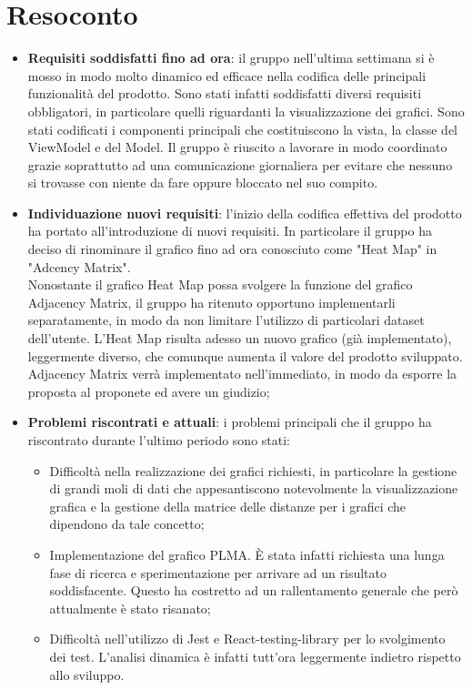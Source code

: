 \section{Resoconto}
\begin{itemize}
	\item \textbf{Requisiti soddisfatti fino ad ora}: il gruppo nell'ultima settimana si è mosso in modo molto dinamico ed efficace nella codifica delle principali funzionalità del prodotto. Sono stati infatti soddisfatti diversi requisiti obbligatori, in particolare quelli riguardanti la visualizzazione dei grafici. Sono stati codificati i componenti principali che costituiscono la vista, la classe del ViewModel e del Model. Il gruppo è riuscito a lavorare in modo coordinato grazie soprattutto ad una comunicazione giornaliera per evitare che nessuno si trovasse con niente da fare oppure bloccato nel suo compito.
	\item \textbf{Individuazione nuovi requisiti}: l'inizio della codifica effettiva del prodotto ha portato all'introduzione di nuovi requisiti. In particolare il gruppo ha deciso di rinominare il grafico fino ad ora conosciuto come "Heat Map" in "Adcency Matrix". \\Nonostante il grafico Heat Map possa svolgere la funzione del grafico Adjacency Matrix, il gruppo ha ritenuto opportuno implementarli separatamente, in modo da non limitare l'utilizzo di particolari dataset dell'utente. L'Heat Map risulta adesso un nuovo grafico (già implementato), leggermente diverso, che comunque aumenta il valore del prodotto sviluppato. Adjacency Matrix verrà implementato nell'immediato, in modo da esporre la proposta al proponete ed avere un giudizio;
	\item \textbf{Problemi riscontrati e attuali}: i problemi principali che il gruppo ha riscontrato durante l'ultimo periodo sono stati:
	\begin{itemize}
		\item Difficoltà nella realizzazione dei grafici richiesti, in particolare la gestione di grandi moli di dati che appesantiscono notevolmente la visualizzazione grafica e la gestione della matrice delle distanze per i grafici che dipendono da tale concetto;
		\item Implementazione del grafico PLMA. È stata infatti richiesta una lunga fase di ricerca e sperimentazione per arrivare ad un risultato soddisfacente. Questo ha costretto ad un rallentamento generale che però attualmente è stato risanato;
		\item Difficoltà nell'utilizzo di Jest e React-testing-library per lo svolgimento dei test. L'analisi dinamica è infatti tutt'ora leggermente indietro rispetto allo sviluppo.

\end{itemize}
\end{itemize}
